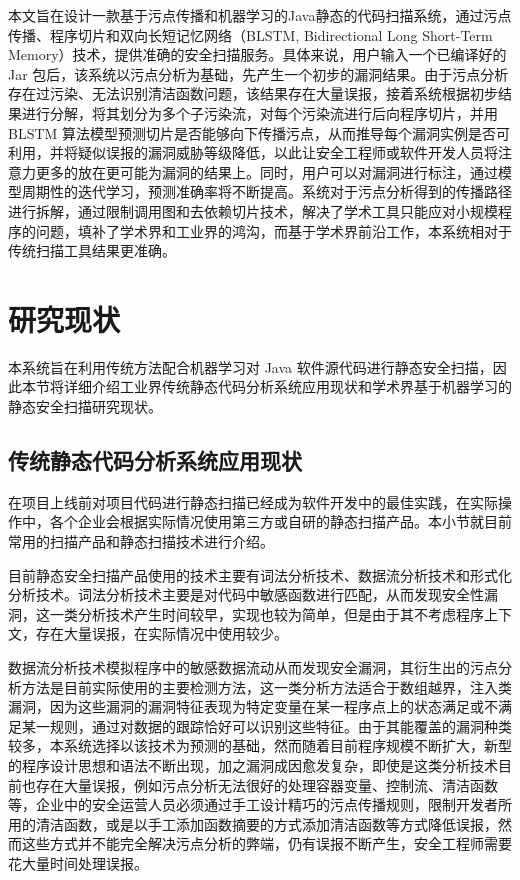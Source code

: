 本文旨在设计一款基于污点传播和机器学习的Java静态的代码扫描系统，通过污点传播、程序切片和双向长短记忆网络（BLSTM, Bidirectional Long Short-Term Memory）技术，提供准确的安全扫描服务。具体来说，用户输入一个已编译好的 Jar 包后，该系统以污点分析为基础，先产生一个初步的漏洞结果。由于污点分析存在过污染、无法识别清洁函数问题，该结果存在大量误报，接着系统根据初步结果进行分解，将其划分为多个子污染流，对每个污染流进行后向程序切片，并用 BLSTM 算法模型预测切片是否能够向下传播污点，从而推导每个漏洞实例是否可利用，并将疑似误报的漏洞威胁等级降低，以此让安全工程师或软件开发人员将注意力更多的放在更可能为漏洞的结果上。同时，用户可以对漏洞进行标注，通过模型周期性的迭代学习，预测准确率将不断提高。系统对于污点分析得到的传播路径进行拆解，通过限制调用图和去依赖切片技术，解决了学术工具只能应对小规模程序的问题，填补了学术界和工业界的鸿沟，而基于学术界前沿工作，本系统相对于传统扫描工具结果更准确。

\section{研究现状}
本系统旨在利用传统方法配合机器学习对 Java 软件源代码进行静态安全扫描，因此本节将详细介绍工业界传统静态代码分析系统应用现状和学术界基于机器学习的静态安全扫描研究现状。

\subsection{传统静态代码分析系统应用现状}

在项目上线前对项目代码进行静态扫描已经成为软件开发中的最佳实践，在实际操作中，各个企业会根据实际情况使用第三方或自研的静态扫描产品。本小节就目前常用的扫描产品和静态扫描技术进行介绍。

目前静态安全扫描产品使用的技术主要有词法分析技术、数据流分析技术和形式化分析技术。词法分析技术主要是对代码中敏感函数进行匹配，从而发现安全性漏洞，这一类分析技术产生时间较早，实现也较为简单，但是由于其不考虑程序上下文，存在大量误报，在实际情况中使用较少。

数据流分析技术模拟程序中的敏感数据流动从而发现安全漏洞，其衍生出的污点分析方法是目前实际使用的主要检测方法，这一类分析方法适合于数组越界，注入类漏洞，因为这些漏洞的漏洞特征表现为特定变量在某一程序点上的状态满足或不满足某一规则，通过对数据的跟踪恰好可以识别这些特征。由于其能覆盖的漏洞种类较多，本系统选择以该技术为预测的基础，然而随着目前程序规模不断扩大，新型的程序设计思想和语法不断出现，加之漏洞成因愈发复杂，即使是这类分析技术目前也存在大量误报，例如污点分析无法很好的处理容器变量、控制流、清洁函数等，企业中的安全运营人员必须通过手工设计精巧的污点传播规则，限制开发者所用的清洁函数，或是以手工添加函数摘要的方式添加清洁函数等方式降低误报，然而这些方式并不能完全解决污点分析的弊端，仍有误报不断产生，安全工程师需要花大量时间处理误报。
   
